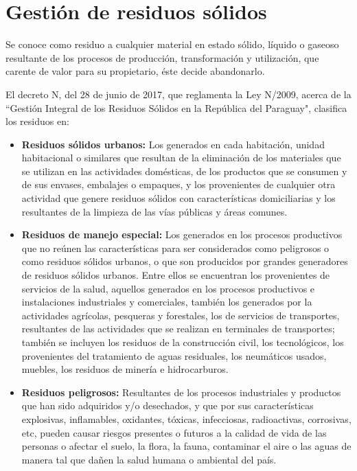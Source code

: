 \chapter{Gestión de residuos sólidos}
\label{chap2}
\ifpdf
  \graphicspath{{Chapter2/Chapter2Figs/}}
\else
  \graphicspath{{Chapter2/Chapter2Figs/}}\fi


Se conoce como residuo a cualquier material en estado sólido, líquido o gaseoso resultante de los procesos de producción, transformación y utilización, que carente de valor para su propietario, éste decide abandonarlo.

El decreto N, del 28 de junio de 2017, que reglamenta la Ley N/2009, acerca de la ``Gestión Integral de los Residuos Sólidos en la República del Paraguay", clasifica los residuos en:

\begin{itemize}
\item \textbf{Residuos sólidos urbanos:} Los generados en cada habitación, unidad habitacional o similares que resultan de la eliminación de los materiales que se utilizan en las actividades domésticas, de los productos que se consumen y de sus envases, embalajes o empaques, y los provenientes de cualquier otra actividad que genere residuos sólidos con características domiciliarias y los resultantes de la limpieza de las vías públicas y áreas comunes.
\item \textbf{Residuos de manejo especial:} Los generados en los procesos productivos que no reúnen las características para ser considerados como peligrosos o como residuos sólidos urbanos, o que son producidos por grandes generadores de residuos sólidos urbanos. Entre ellos se encuentran los provenientes de servicios de la salud, aquellos generados en los procesos productivos e instalaciones industriales y comerciales, también los generados por la actividades agrícolas, pesqueras y forestales, los de servicios de transportes, resultantes de las actividades que se realizan en terminales de transportes; también se incluyen los residuos de la construcción civil, los tecnológicos, los provenientes del tratamiento de aguas residuales, los neumáticos usados, muebles, los residuos de minería e hidrocarburos.
\item \textbf{Residuos peligrosos:} Resultantes de los procesos industriales y productos que han sido adquiridos y/o desechados, y que por sus características explosivas, inflamables, oxidantes, tóxicas, infecciosas, radioactivas, corrosivas, etc, pueden causar riesgos presentes o futuros a la calidad de vida de las personas o afectar el suelo, la flora, la fauna, contaminar el aire o las aguas de manera tal que dañen la salud humana o ambiental del país.
\end{itemize}

